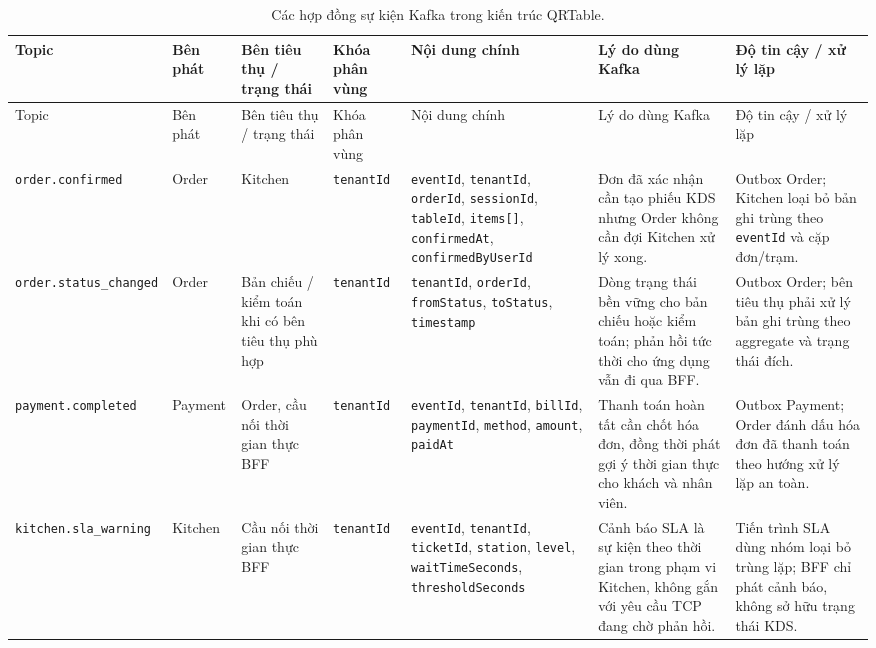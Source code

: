 {\scriptsize
\setlength{\tabcolsep}{1pt}
\begin{longtable}{>{\raggedright\arraybackslash}p{}>{\raggedright\arraybackslash}p{}>{\raggedright\arraybackslash}p{}>{\raggedright\arraybackslash}p{}>{\raggedright\arraybackslash}p{}>{\raggedright\arraybackslash}p{}>{\raggedright\arraybackslash}p{}}
  \caption{Các hợp đồng sự kiện Kafka trong kiến trúc QRTable.}
  \label{tab:chapter4-kafka-topic-registry}\\
  \toprule
  Topic & Bên phát & Bên tiêu thụ / trạng thái & Khóa phân vùng & Nội dung chính & Lý do dùng Kafka & Độ tin cậy / xử lý lặp \\
  \midrule
  \endfirsthead
  \toprule
  Topic & Bên phát & Bên tiêu thụ / trạng thái & Khóa phân vùng & Nội dung chính & Lý do dùng Kafka & Độ tin cậy / xử lý lặp \\
  \midrule
  \endhead
  \bottomrule
  \endfoot
  \texttt{order.}\newline\texttt{confirmed} & Order & Kitchen & \texttt{tenantId} & \texttt{eventId}, \texttt{tenantId}, \texttt{orderId}, \texttt{sessionId}, \texttt{tableId}, \texttt{items[]}, \texttt{confirmedAt}, \texttt{confirmedByUserId} & Đơn đã xác nhận cần tạo phiếu KDS nhưng Order không cần đợi Kitchen xử lý xong. & Outbox Order; Kitchen loại bỏ bản ghi trùng theo \texttt{eventId} và cặp đơn/trạm. \\
  \texttt{order.}\newline\texttt{status\_}\newline\texttt{changed} & Order & Bản chiếu / kiểm toán khi có bên tiêu thụ phù hợp & \texttt{tenantId} & \texttt{tenantId}, \texttt{orderId}, \texttt{fromStatus}, \texttt{toStatus}, \texttt{timestamp} & Dòng trạng thái bền vững cho bản chiếu hoặc kiểm toán; phản hồi tức thời cho ứng dụng vẫn đi qua BFF. & Outbox Order; bên tiêu thụ phải xử lý bản ghi trùng theo aggregate và trạng thái đích. \\
  \texttt{payment.}\newline\texttt{completed} & Payment & Order, cầu nối thời gian thực BFF & \texttt{tenantId} & \texttt{eventId}, \texttt{tenantId}, \texttt{billId}, \texttt{paymentId}, \texttt{method}, \texttt{amount}, \texttt{paidAt} & Thanh toán hoàn tất cần chốt hóa đơn, đồng thời phát gợi ý thời gian thực cho khách và nhân viên. & Outbox Payment; Order đánh dấu hóa đơn đã thanh toán theo hướng xử lý lặp an toàn. \\
  \texttt{kitchen.sla\_}\newline\texttt{warning} & Kitchen & Cầu nối thời gian thực BFF & \texttt{tenantId} & \texttt{eventId}, \texttt{tenantId}, \texttt{ticketId}, \texttt{station}, \texttt{level}, \texttt{waitTimeSeconds}, \texttt{thresholdSeconds} & Cảnh báo SLA là sự kiện theo thời gian trong phạm vi Kitchen, không gắn với yêu cầu TCP đang chờ phản hồi. & Tiến trình SLA dùng nhóm loại bỏ trùng lặp; BFF chỉ phát cảnh báo, không sở hữu trạng thái KDS. \\

\end{longtable}}

